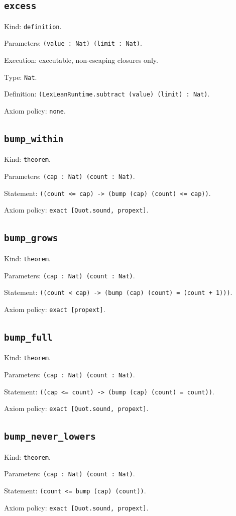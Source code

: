 \documentclass[11pt]{article}
\begin{document}
\subsection*{\texttt{excess}}
\noindent Kind: \texttt{definition}.\par
\noindent Parameters: \texttt{(value : Nat) (limit : Nat)}.\par
\noindent Execution: executable, non-escaping closures only.\par
\noindent Type: \texttt{Nat}.\par
\noindent Definition: \texttt{(LexLeanRuntime.subtract (value) (limit) : Nat)}.\par
\noindent Axiom policy: \texttt{none}.\par
\subsection*{\texttt{bump\_within}}
\noindent Kind: \texttt{theorem}.\par
\noindent Parameters: \texttt{(cap : Nat) (count : Nat)}.\par
\noindent Statement: \texttt{((count <= cap) -> (bump (cap) (count) <= cap))}.\par
\noindent Axiom policy: \texttt{exact [Quot.sound, propext]}.\par
\subsection*{\texttt{bump\_grows}}
\noindent Kind: \texttt{theorem}.\par
\noindent Parameters: \texttt{(cap : Nat) (count : Nat)}.\par
\noindent Statement: \texttt{((count < cap) -> (bump (cap) (count) = (count + 1)))}.\par
\noindent Axiom policy: \texttt{exact [propext]}.\par
\subsection*{\texttt{bump\_full}}
\noindent Kind: \texttt{theorem}.\par
\noindent Parameters: \texttt{(cap : Nat) (count : Nat)}.\par
\noindent Statement: \texttt{((cap <= count) -> (bump (cap) (count) = count))}.\par
\noindent Axiom policy: \texttt{exact [Quot.sound, propext]}.\par
\subsection*{\texttt{bump\_never\_lowers}}
\noindent Kind: \texttt{theorem}.\par
\noindent Parameters: \texttt{(cap : Nat) (count : Nat)}.\par
\noindent Statement: \texttt{(count <= bump (cap) (count))}.\par
\noindent Axiom policy: \texttt{exact [Quot.sound, propext]}.\par
\end{document}
